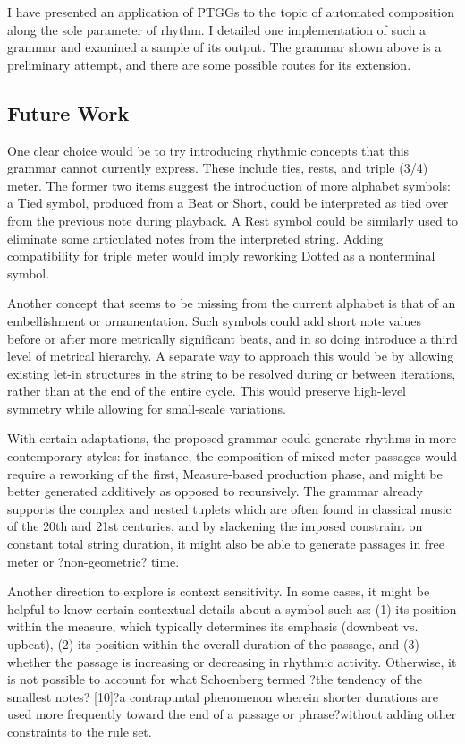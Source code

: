 \documentclass{article}
\begin{document}
I have presented an application of PTGGs to the topic of automated composition along the sole parameter of rhythm. I detailed one implementation of such a grammar and examined a sample of its output. The grammar shown above is a preliminary attempt, and there are some possible routes for its extension. 


\subsection{Future Work}


One clear choice would be to try introducing rhythmic concepts that this grammar cannot currently express. These include ties, rests, and triple (3/4) meter. The former two items suggest the introduction of more alphabet symbols: a Tied symbol, produced from a Beat or Short, could be interpreted as tied over from the previous note during playback. A Rest symbol could be similarly used to eliminate some articulated notes from the interpreted string. Adding compatibility for triple meter would imply reworking Dotted as a nonterminal symbol.

Another concept that seems to be missing from the current alphabet is that of an embellishment or ornamentation. Such symbols could add short note values before or after more metrically significant beats, and in so doing introduce a third level of metrical hierarchy. A separate way to approach this would be by allowing existing let-in structures in the string to be resolved during or between iterations, rather than at the end of the entire cycle. This would preserve high-level symmetry while allowing for small-scale variations.

With certain adaptations, the proposed grammar could generate rhythms in more contemporary styles: for instance, the composition of mixed-meter passages would require a reworking of the first, Measure-based production phase, and might be better generated additively as opposed to recursively. The grammar already supports the complex and nested tuplets which are often found in classical music of the 20th and 21st centuries, and by slackening the imposed constraint on constant total string duration, it might also be able to generate passages in free meter or ?non-geometric? time.

Another direction to explore is context sensitivity. In some cases, it might be helpful to know certain contextual details about a symbol such as: (1) its position within the measure, which typically determines its emphasis (downbeat vs. upbeat), (2) its position within the overall duration of the passage, and (3) whether the passage is increasing or decreasing in rhythmic activity. Otherwise, it is not possible to account for what Schoenberg termed ?the tendency of the smallest notes? [10]?a contrapuntal phenomenon wherein shorter durations are used more frequently toward the end of a passage or phrase?without adding other constraints to the rule set.
\end{document}
